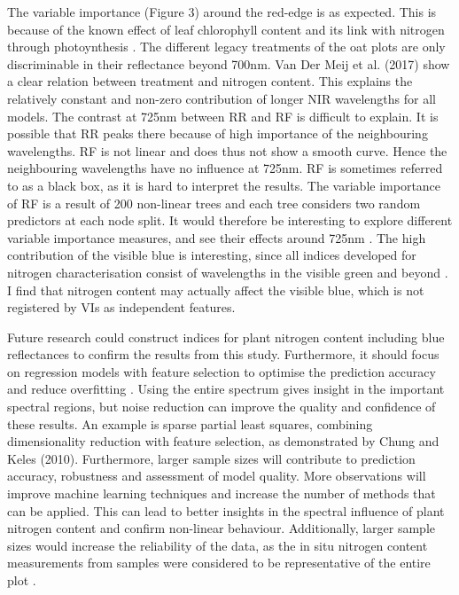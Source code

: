 \documentclass{isprs}
\begin{document}
The variable importance (Figure 3) around the red-edge is as expected. This is because of the known effect of leaf chlorophyll content and its link with nitrogen through photoynthesis \cite{Kooistra2016}. The different legacy treatments of the oat plots are only discriminable in their reflectance beyond 700nm. Van Der Meij et al. (2017) show a clear relation between treatment and nitrogen content. This explains the relatively constant and non-zero contribution of longer NIR wavelengths for all models. The contrast at 725nm between RR and RF is difficult to explain. It is possible that RR peaks there because of high importance of the neighbouring wavelengths. RF is not linear and does thus not show a smooth curve. Hence the neighbouring wavelengths have no influence at 725nm. RF is sometimes referred to as a black box, as it is hard to interpret the results. The variable importance of RF is a result of 200 non-linear trees and each tree considers two random predictors at each node split. It would therefore be interesting to explore different variable importance measures, and see their effects around 725nm \cite{Strobl2008}. The high contribution of the visible blue is interesting, since all indices developed for nitrogen characterisation consist of wavelengths in the visible green and beyond \cite{Mulla2013}. I find that nitrogen content may actually affect the visible blue, which is not registered by VIs as independent features. 

Future research could construct indices for plant nitrogen content including blue reflectances to confirm the results from this study. Furthermore, it should focus on regression models with feature selection to optimise the prediction accuracy and reduce overfitting \cite{Ji2015}. Using the entire spectrum gives insight in the important spectral regions, but noise reduction can improve the quality and confidence of these results. An example is sparse partial least squares, combining dimensionality reduction with feature selection, as demonstrated by Chung and Keles (2010). Furthermore, larger sample sizes will contribute to prediction accuracy, robustness and assessment of model quality. More observations will improve machine learning techniques and increase the number of methods that can be applied. This can lead to better insights in the spectral influence of plant nitrogen content and confirm non-linear behaviour. Additionally, larger sample sizes would increase the reliability of the data, as the in situ nitrogen content measurements from samples were considered to be representative of the entire plot \cite{VanDerMeij2017}. 
\end{document}
